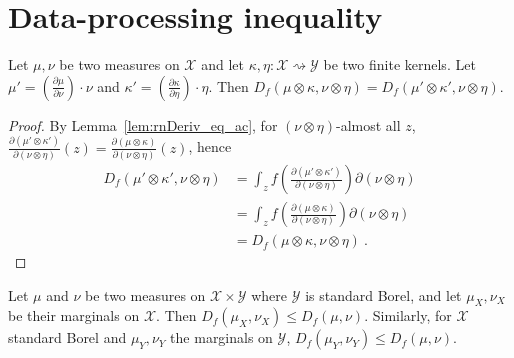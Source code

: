 \section{Data-processing inequality}

\begin{lemma}
  \label{lem:fDiv_compProd_eq_ac}
  \leanok
  Let $\mu, \nu$ be two measures on $\mathcal X$ and let $\kappa, \eta : \mathcal X \rightsquigarrow \mathcal Y$ be two finite kernels. Let $\mu' = \left(\frac{\partial \mu}{\partial \nu}\right) \cdot \nu$ and $\kappa' = \left(\frac{\partial \kappa}{\partial \eta}\right) \cdot \eta$.
  Then $D_f(\mu \otimes \kappa, \nu \otimes \eta) = D_f(\mu' \otimes \kappa', \nu \otimes \eta)$.
\end{lemma}

\begin{proof} \leanok
{}
By Lemma~\ref{lem:rnDeriv_eq_ac}, for $(\nu \otimes \eta)$-almost all $z$, $\frac{\partial(\mu' \otimes \kappa')}{\partial(\nu \otimes \eta)}(z) = \frac{\partial(\mu \otimes \kappa)}{\partial(\nu \otimes \eta)}(z)$, hence
\begin{align*}
D_f(\mu' \otimes \kappa', \nu \otimes \eta)
&= \int_z f\left(\frac{\partial(\mu' \otimes \kappa')}{\partial(\nu \otimes \eta)}\right) \partial(\nu \otimes \eta)
\\
&= \int_z f\left(\frac{\partial(\mu \otimes \kappa)}{\partial(\nu \otimes \eta)}\right) \partial(\nu \otimes \eta)
\\
&= D_f(\mu \otimes \kappa, \nu \otimes \eta)
\: .
\end{align*}

\end{proof}

\begin{theorem}[Marginals]
  \label{thm:fDiv_fst_le}
  Let $\mu$ and $\nu$ be two measures on $\mathcal X \times \mathcal Y$ where $\mathcal Y$ is standard Borel, and let $\mu_X, \nu_X$ be their marginals on $\mathcal X$.
  Then $D_f(\mu_X, \nu_X) \le D_f(\mu, \nu)$.
  Similarly, for $\mathcal X$ standard Borel and $\mu_Y, \nu_Y$ the marginals on $\mathcal Y$, $D_f(\mu_Y, \nu_Y) \le D_f(\mu, \nu)$.
\end{theorem}

